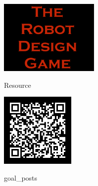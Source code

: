 \documentclass[11pt]{article}
\begin{document}
\color{white}            
    
    \begin{center}
        \vfill
        \vfill
        \vfill

        \includegraphics[height=3.6cm]{rdg_logo}%
        
        \vfill

        

Resource



        \includegraphics[height=3.6cm]{goal_posts-qr}%

        goal\_posts

        \vfill
    \end{center}
\end{document}
